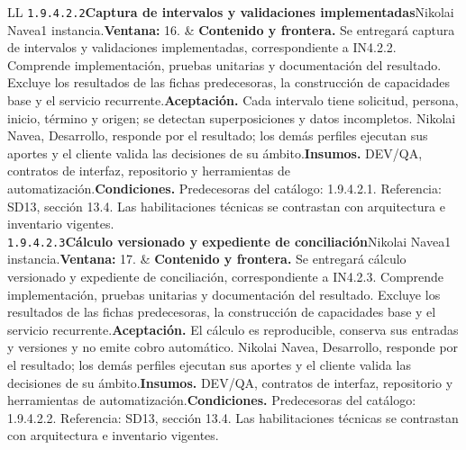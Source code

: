 \begin{longtable}{L{\tabcolsep\relax}L{\tabcolsep\relax}}
\texttt{1.\allowbreak{}9.\allowbreak{}4.\allowbreak{}2.\allowbreak{}2}\newline{}\textbf{Captura de intervalos y validaciones implementadas}\newline{}Nikolai Navea\newline{}1 instancia.\newline{}\textbf{Ventana:} 16. & \textbf{Contenido y frontera.} Se entregará captura de intervalos y validaciones implementadas, correspondiente a IN4.2.2. Comprende implementación, pruebas unitarias y documentación del resultado. Excluye los resultados de las fichas predecesoras, la construcción de capacidades base y el servicio recurrente.\newline{}\textbf{Aceptación.} Cada intervalo tiene solicitud, persona, inicio, término y origen; se detectan superposiciones y datos incompletos. Nikolai Navea, Desarrollo, responde por el resultado; los demás perfiles ejecutan sus aportes y el cliente valida las decisiones de su ámbito.\newline{}\textbf{Insumos.} DEV/QA, contratos de interfaz, repositorio y herramientas de automatización.\newline{}\textbf{Condiciones.} Predecesoras del catálogo: 1.9.4.2.1. Referencia: SD13, sección 13.4. Las habilitaciones técnicas se contrastan con arquitectura e inventario vigentes.\\\hline
\texttt{1.\allowbreak{}9.\allowbreak{}4.\allowbreak{}2.\allowbreak{}3}\newline{}\textbf{Cálculo versionado y expediente de conciliación}\newline{}Nikolai Navea\newline{}1 instancia.\newline{}\textbf{Ventana:} 17. & \textbf{Contenido y frontera.} Se entregará cálculo versionado y expediente de conciliación, correspondiente a IN4.2.3. Comprende implementación, pruebas unitarias y documentación del resultado. Excluye los resultados de las fichas predecesoras, la construcción de capacidades base y el servicio recurrente.\newline{}\textbf{Aceptación.} El cálculo es reproducible, conserva sus entradas y versiones y no emite cobro automático. Nikolai Navea, Desarrollo, responde por el resultado; los demás perfiles ejecutan sus aportes y el cliente valida las decisiones de su ámbito.\newline{}\textbf{Insumos.} DEV/QA, contratos de interfaz, repositorio y herramientas de automatización.\newline{}\textbf{Condiciones.} Predecesoras del catálogo: 1.9.4.2.2. Referencia: SD13, sección 13.4. Las habilitaciones técnicas se contrastan con arquitectura e inventario vigentes.\\\hline

\end{longtable}
